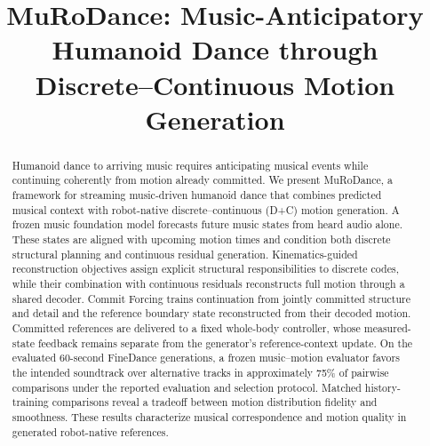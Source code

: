 \documentclass[letterpaper,10pt,conference]{ieeeconf}
\title{\LARGE\bfseries MuRoDance: Music-Anticipatory Humanoid Dance through Discrete--Continuous Motion Generation}
\author{\vphantom{Anonymous Authors}}
\newcommand{\method}{MuRoDance}
\newcommand{\cof}{Commit Forcing}
\begin{document}
\maketitle
\thispagestyle{empty}
\pagestyle{empty}
\begin{abstract}
Humanoid dance to arriving music requires anticipating musical events
while continuing coherently from motion already committed.
We present \method{}, a framework for streaming music-driven humanoid
dance that combines predicted musical context with robot-native
discrete--continuous (D+C) motion generation.
A frozen music foundation model forecasts future music states from
heard audio alone. These states are aligned with upcoming motion
times and condition both discrete structural planning and continuous
residual generation.
Kinematics-guided reconstruction objectives assign explicit structural
responsibilities to discrete codes, while their combination with
continuous residuals reconstructs full motion through a shared decoder.
\cof{} trains continuation from jointly committed structure and detail
and the reference boundary state reconstructed from their decoded motion.
Committed references are delivered to a fixed whole-body controller,
whose measured-state feedback remains separate from the generator's
reference-context update.
On the evaluated 60-second FineDance generations, a frozen music--motion
evaluator favors the intended soundtrack over alternative tracks in
approximately 75\% of pairwise comparisons under the reported evaluation
and selection protocol.
Matched history-training comparisons reveal a tradeoff between motion
distribution fidelity and smoothness.
These results characterize musical correspondence and motion quality
in generated robot-native references.
\end{abstract}





\FloatBarrier
\appendices
% 
\FloatBarrier


\end{document}
